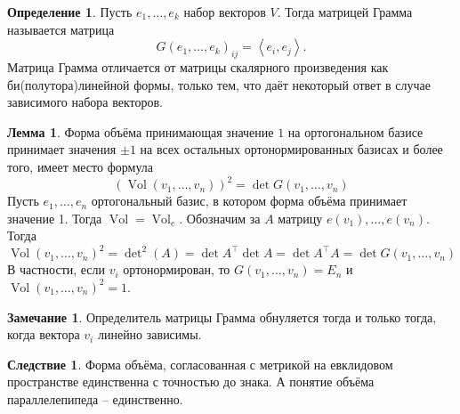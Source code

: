 \documentclass[10pt,a4paper,oneside]{book} %
\theoremstyle{definition}
\newtheorem*{rem}{Замечание}
\newtheorem{zad}{Задача}
\newtheorem*{defn}{Определение}
\newtheorem{lem}{Лемма}
\newtheorem{cor}{Следствие}
\newcommand{\Vol}{\operatorname{Vol}}
\def\lan{\left\langle }
\def\ran{\right\rangle}
\def\dfn{\begin{defn}}
\def\edfn{\end{defn}}
\def\lm{\begin{lem}}
\def\elm{\end{lem}}
\def\zd{\begin{zad}}
\def\ezd{\end{zad}}
\def\crl{\begin{cor}}
\def\ecrl{\end{cor}}
\def\rm{\begin{rem}}
\def\erm{\end{rem}}
\begin{document}
\dfn Пусть $e_1,\dots, e_k$ набор векторов $V$. Тогда матрицей Грамма называется матрица 
$$G(e_1,\dots,e_k)_{ij}= \lan e_i, e_j\ran.$$
Матрица Грамма отличается от матрицы скалярного произведения как би(полутора)линейной формы, только тем, что даёт некоторый ответ в случае зависимого набора векторов. 
\edfn

\lm
Форма объёма принимающая значение $1$ на ортогональном базисе принимает значения $\pm 1$ на всех остальных ортонормированных базисах и более того, имеет место формула
$$(\Vol(v_1,\dots,v_n))^2= \det G(v_1,\dots,v_n)$$
\proof Пусть $e_1,\dots,e_n$ ортогональный базис, в котором форма объёма принимает значение 1. Тогда $\Vol= \Vol_e$. Обозначим за $A$ матрицу $e(v_1),\dots,e(v_n)$. Тогда $$\Vol(v_1,\dots,v_n)^2= \det\nolimits^2 (A)= \det A^{\top} \det A= \det A^{\top}A= \det G(v_1,\dots,v_n)$$
В частности, если $v_i$ ортонормирован, то $G(v_1,\dots,v_n)=E_n$ и $\Vol(v_1,\dots,v_n)^2=1$.
\endproof
\elm

\rm Определитель матрицы Грамма обнуляется тогда и только тогда, когда вектора $v_i$ линейно зависимы.
\erm

\crl Форма объёма, согласованная с метрикой на евклидовом пространстве единственна с точностью до знака. А понятие объёма параллелепипеда -- единственно.
\ecrl


\begin{comment}

Так же можно дать явную формулу для расстояния через определители.
\lm Пусть подпространство $U$ имеет базис $e_1,\dots,e_k$. Тогда $\rho(x_0, U)^2 = \frac{\det G(e_1,\dots,e_k,x_0)}{\det G(e_1,\dots,e_k)}$ 
\elm 



\dfn $V$ --- евклидово пространство $U$ -- его подпространство, а $x_0$ вектор из $V$. Определим косинус угла $\angle x_0,U$ как 
$$\cos \angle x_0,U=\sup_{0\neq y\in U} \cos \angle x_0,y =\sup_{0\neq y\in U} \frac{|\lan x_0,y\ran| }{\|x_0\|\|y\|}.$$  
То есть мы ищем минимальный угол из отрезка $[0,\frac{\pi}{2}]$. Заметим, что в евклидовом случае отрицательные косинусы не имеют смысла, так как всегда можно домножить $y$ на $-1$.
\edfn

\lm Наименьший угол достигается между $x_0$ и его проекцией на $U$ и его косинус равен $\frac{\|pr_{U}x_0\|}{\|x_0\|}$.  
\elm


\zd Докажите аналогичное свойство в унитарном случае.
\ezd


\end{comment}
\end{document}
